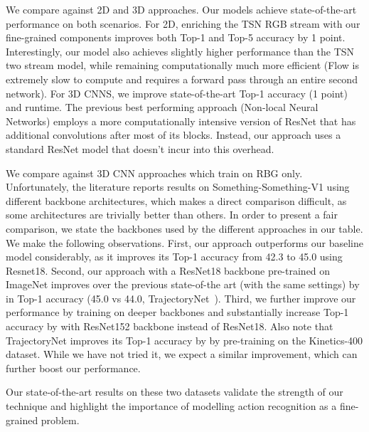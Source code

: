 \documentclass[10pt,twocolumn,letterpaper]{article}
\begin{document}
 We compare against 2D and 3D approaches. Our models achieve state-of-the-art performance on both scenarios. 
For 2D, enriching the TSN RGB stream with our fine-grained components improves both Top-1 and Top-5 accuracy by 1 point. Interestingly, our model also achieves slightly higher performance than the TSN two stream model, while remaining computationally much more efficient (Flow is extremely slow to compute and requires a forward pass through an entire second network). 
For 3D CNNS, we improve state-of-the-art Top-1 accuracy (1 point) and runtime. The previous best performing approach (Non-local Neural Networks) employs a more computationally intensive version of ResNet that has additional convolutions after most of its blocks. Instead, our approach uses a standard ResNet model that doesn't incur into this overhead. 


We compare against 3D CNN approaches which train on RBG only. Unfortunately, the literature reports results on Something-Something-V1 using different backbone architectures, which makes a direct comparison difficult, as some architectures are trivially better than others. In order to present a fair comparison, we state the backbones used by the different approaches in our table.
We make the following observations. 
First, our approach outperforms our baseline model considerably, as it improves its Top-1 accuracy from 42.3 to 45.0 using Resnet18. Second, our approach with a ResNet18 backbone pre-trained on ImageNet improves over the previous state-of-the art (with the same settings) by  in Top-1 accuracy (45.0 vs 44.0, TrajectoryNet~\cite{Trajectory_NIPS18}). Third, we further improve our performance by training on deeper backbones and substantially increase Top-1 accuracy by   with ResNet152 backbone instead of ResNet18. Also note that TrajectoryNet improves its Top-1 accuracy by  by pre-training on the Kinetics-400 dataset. While we have not tried it, we expect a similar improvement, which can further boost our performance. 


Our state-of-the-art results on these two datasets validate the strength of our technique and highlight the importance of modelling action recognition as a fine-grained problem.  
\end{document}
